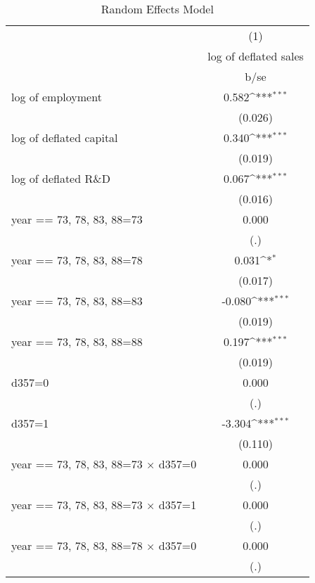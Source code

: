\begin{table}[htbp]\centering
\def\sym#1{\ifmmode^{#1}\else\(^{#1}\)\fi}
\caption{Random Effects Model}
\begin{tabular}{l*{1}{c}}
\toprule
                    &\multicolumn{1}{c}{(1)}\\
                    &\multicolumn{1}{c}{log of deflated sales}\\
                    &        b/se         \\
\midrule
log of employment   &       0.582\sym{***}\\
                    &     (0.026)         \\
log of deflated capital&       0.340\sym{***}\\
                    &     (0.019)         \\
log of deflated R\&D &       0.067\sym{***}\\
                    &     (0.016)         \\
year == 73, 78, 83, 88=73&       0.000         \\
                    &         (.)         \\
year == 73, 78, 83, 88=78&       0.031\sym{*}  \\
                    &     (0.017)         \\
year == 73, 78, 83, 88=83&      -0.080\sym{***}\\
                    &     (0.019)         \\
year == 73, 78, 83, 88=88&       0.197\sym{***}\\
                    &     (0.019)         \\
d357=0              &       0.000         \\
                    &         (.)         \\
d357=1              &      -3.304\sym{***}\\
                    &     (0.110)         \\
year == 73, 78, 83, 88=73 $\times$ d357=0&       0.000         \\
                    &         (.)         \\
year == 73, 78, 83, 88=73 $\times$ d357=1&       0.000         \\
                    &         (.)         \\
year == 73, 78, 83, 88=78 $\times$ d357=0&       0.000         \\
                    &         (.)         \\

\end{tabular}
\end{table}
